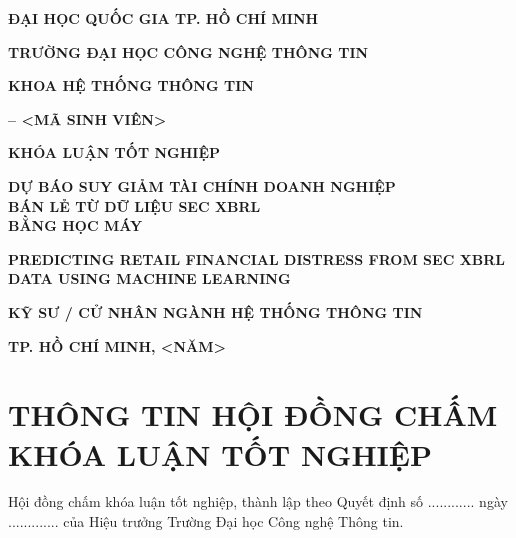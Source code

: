 \documentclass[13pt,a4paper]{extreport}
\begin{document}
\begin{titlepage}
\centering
{\bfseries\fontsize{14}{17}\selectfont ĐẠI HỌC QUỐC GIA TP. HỒ CHÍ MINH\par}
\vspace{4pt}
{\bfseries\fontsize{16}{19}\selectfont TRƯỜNG ĐẠI HỌC CÔNG NGHỆ THÔNG TIN\par}
\vspace{10pt}
{\bfseries\fontsize{14}{17}\selectfont KHOA HỆ THỐNG THÔNG TIN\par}
\vspace{1.4cm}
{\bfseries\fontsize{14}{17} -- <MÃ SINH VIÊN>\par}
\vspace{1.0cm}
{\bfseries\fontsize{16}{19}\selectfont KHÓA LUẬN TỐT NGHIỆP\par}
\vspace{0.8cm}
{\bfseries\fontsize{18}{22}\selectfont DỰ BÁO SUY GIẢM TÀI CHÍNH DOANH NGHIỆP\\[2pt] BÁN LẺ TỪ DỮ LIỆU SEC XBRL\\[2pt] BẰNG HỌC MÁY\par}
\vspace{0.5cm}
{\bfseries\fontsize{15}{18}\selectfont PREDICTING RETAIL FINANCIAL DISTRESS FROM SEC XBRL DATA USING MACHINE LEARNING\par}
\vspace{0.8cm}
{\bfseries\fontsize{14}{17}\selectfont KỸ SƯ / CỬ NHÂN NGÀNH HỆ THỐNG THÔNG TIN\par}
\vfill
{}
\vspace{0.8cm}
{\bfseries\fontsize{13}{16}\selectfont TP. HỒ CHÍ MINH, <NĂM>\par}
\end{titlepage}

\chapter*{THÔNG TIN HỘI ĐỒNG CHẤM KHÓA LUẬN TỐT NGHIỆP}
Hội đồng chấm khóa luận tốt nghiệp, thành lập theo Quyết định số ............ ngày ............. của
Hiệu trưởng Trường Đại học Công nghệ Thông tin.
\vspace{0.4cm}
\end{document}
